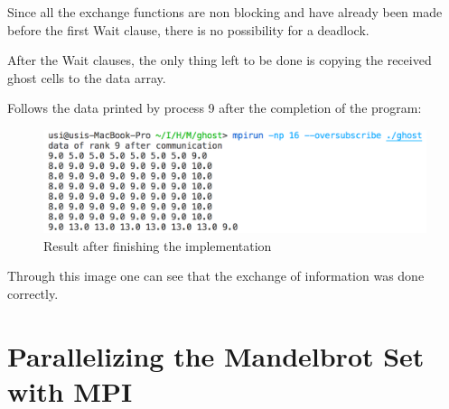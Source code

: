 \documentclass[unicode,11pt,a4paper,oneside,numbers=endperiod,openany]{scrartcl}
\begin{document}
\begin{itemize}
Since all the exchange functions are non blocking and have already been made before the first Wait clause, there is no possibility for a deadlock.

After the Wait clauses, the only thing left to be done is copying the received ghost cells to the data array.

Follows the data printed by process 9 after the completion of the program:

\begin{figure}[H]
    \includegraphics[width=\linewidth]{result}
    \caption{Result after finishing the implementation}
\end{figure}

Through this image one can see that the exchange of information was done correctly.

\end{itemize}

\section{Parallelizing the Mandelbrot Set with MPI }
\end{document}
